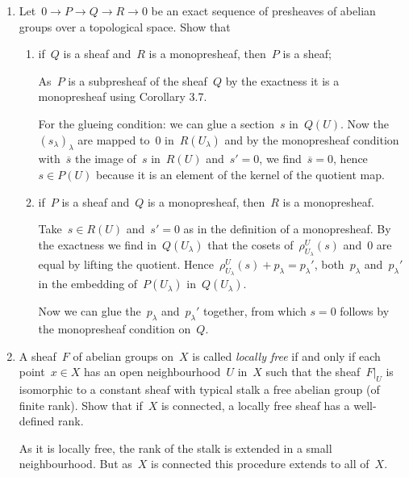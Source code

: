 \documentclass[a4paper,11pt,oneside,openany,article]{memoir}
\begin{document}
\begin{enumerate}
  \item Let~$0\to P\to Q\to R\to 0$ be an exact sequence of presheaves of abelian groups over a topological space. Show that
    \begin{enumerate}
      \item if~$Q$ is a sheaf and~$R$ is a monopresheaf, then~$P$ is a sheaf;

        \begin{solution}
          As~$P$ is a subpresheaf of the sheaf~$Q$ by the exactness it is a monopresheaf using Corollary 3.7.

          For the glueing condition: we can glue a section~$s$ in~$Q(U)$. Now the~$(s_\lambda)_\lambda$ are mapped to~$0$ in~$R(U_\lambda)$ and by the monopresheaf condition with~$\overline{s}$ the image of~$s$ in~$R(U)$ and~$s'=0$, we find~$\overline{s}=0$, hence~$s\in P(U)$ because it is an element of the kernel of the quotient map.
        \end{solution}

      \item if~$P$ is a sheaf and~$Q$ is a monopresheaf, then~$R$ is a monopresheaf.

        \begin{solution}
          Take~$s\in R(U)$ and~$s'=0$ as in the definition of a monopresheaf. By the exactness we find in~$Q(U_\lambda)$ that the cosets of~$\rho^U_{U_\lambda}(s)$ and~$0$ are equal by lifting the quotient. Hence~$\rho^U_{U_\lambda}(s)+p_\lambda=p_\lambda'$, both~$p_\lambda$ and~$p_\lambda'$ in the embedding of~$P(U_\lambda)$ in~$Q(U_\lambda)$.

          Now we can glue the~$p_\lambda$ and~$p_\lambda'$ together, from which $s=0$ follows by the monopresheaf condition on~$Q$.
        \end{solution}
    \end{enumerate}

  \item A sheaf~$F$ of abelian groups on~$X$ is called \emph{locally free} if and only if each point~$x\in X$ has an open neighbourhood~$U$ in~$X$ such that the sheaf~$F|_U$ is isomorphic to a constant sheaf with typical stalk a free abelian group (of finite rank). Show that if~$X$ is connected, a locally free sheaf has a well-defined rank.

    \begin{solution}
      As it is locally free, the rank of the stalk is extended in a small neighbourhood. But as~$X$ is connected this procedure extends to all of~$X$.
    \end{solution}


\end{enumerate}
\end{document}
